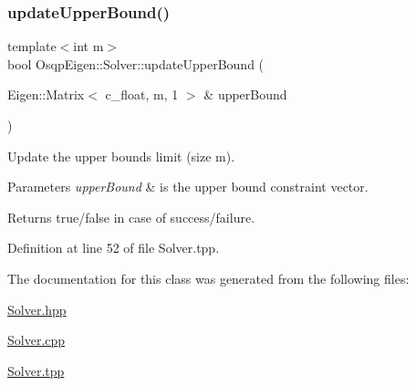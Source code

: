 \subsubsection{\texorpdfstring{update\+Upper\+Bound()}{updateUpperBound()}}
{\footnotesize\ttfamily template$<$int m$>$ \\
bool Osqp\+Eigen\+::\+Solver\+::update\+Upper\+Bound (\begin{DoxyParamCaption}\item[{Eigen\+::\+Matrix$<$ c\+\_\+float, m, 1 $>$ \&}]{upper\+Bound }\end{DoxyParamCaption})}



Update the upper bounds limit (size m). 


\begin{DoxyParams}{Parameters}
{\em upper\+Bound} & is the upper bound constraint vector. \\
\hline
\end{DoxyParams}
\begin{DoxyReturn}{Returns}
true/false in case of success/failure. 
\end{DoxyReturn}


Definition at line 52 of file Solver.\+tpp.



The documentation for this class was generated from the following files\+:\begin{DoxyCompactItemize}
\item 
\mbox{\hyperlink{Solver_8hpp}{Solver.\+hpp}}\item 
\mbox{\hyperlink{Solver_8cpp}{Solver.\+cpp}}\item 
\mbox{\hyperlink{Solver_8tpp}{Solver.\+tpp}}\end{DoxyCompactItemize}
